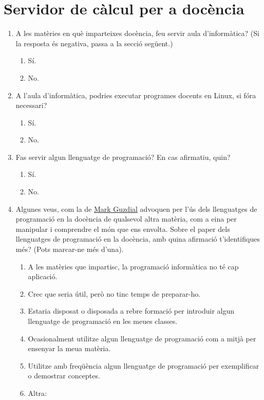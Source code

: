 \documentclass[a4paper,12pt]{article}
\begin{document}
\section{Servidor de càlcul per a docència}
\begin{enumerate}
\item A les matèries en què imparteixes docència, feu servir aula d'informàtica? (Si la resposta
és negativa, passa a la secció següent.)
   \begin{enumerate}
   \item Sí.
   \item No.
   \end{enumerate}
\item A l'aula d'informàtica, podries executar programes docents en Linux, si fóra necessari?
   \begin{enumerate}
   \item Sí.
   \item No.
   \end{enumerate}
\item Fas servir algun llenguatge de programació? En cas afirmatiu, quin?
   \begin{enumerate}
   \item Sí.
   \item No.
   \end{enumerate}
\item Algunes veus, com la de \href{https://youtu.be/mGc6clf_Wt4}{Mark Guzdial} advoquen per l'ús dels
llenguatges de programació en la docència de qualsevol altra matèria, com a eina per manipular i
comprendre el món que ens envolta. Sobre el paper dels llenguatges de programació en la docència,
amb quina afirmació t'identifiques més? (Pots marcar-ne més d'una).
   \begin{enumerate}
   \item A les matèries que impartisc, la programació informàtica no té cap aplicació.
   \item Crec que seria útil, però no tinc temps de preparar-ho.
   \item Estaria disposat o disposada a rebre formació per introduir algun llenguatge de programació en les meues classes.
   \item Ocasionalment utilitze algun llenguatge de programació com a mitjà per ensenyar la meua matèria.
   \item Utilitze amb freqüència algun llenguatge de programació per exemplificar o demostrar conceptes.
   \item Altra:
   \end{enumerate}


\end{enumerate}
\end{document}
